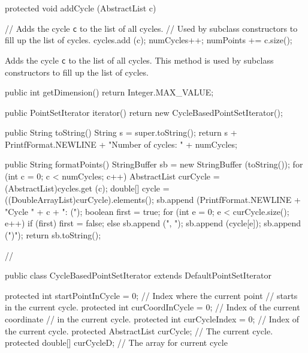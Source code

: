 \begin{code}

   protected void addCycle (AbstractList c) \begin{hide} {
      // Adds the cycle \texttt{c} to the list of all cycles.
      // Used by subclass constructors to fill up the list of cycles.
      cycles.add (c);
      numCycles++;
      numPoints += c.size();
   }\end{hide}
\end{code}
\begin{tabb}
   Adds the cycle \texttt{c} to the list of all cycles.
   This method is used by subclass constructors to fill up the list of cycles.
\end{tabb}
\begin{code}\begin{hide}

   public int getDimension() {
     return Integer.MAX_VALUE;
   }

   public PointSetIterator iterator(){
      return new  CycleBasedPointSetIterator();
   }

   public String toString() {
      String s = super.toString();
      return s + PrintfFormat.NEWLINE + "Number of cycles: " + numCycles;
   }

   public String formatPoints() {
      StringBuffer sb = new StringBuffer (toString());
      for (int c = 0; c < numCycles; c++) {
         AbstractList curCycle = (AbstractList)cycles.get (c);
         double[] cycle = ((DoubleArrayList)curCycle).elements();
         sb.append (PrintfFormat.NEWLINE + "Cycle " + c + ": (");
         boolean first = true;
         for (int e = 0; e < curCycle.size(); e++) {
            if (first)
               first = false;
            else
               sb.append (", ");
            sb.append (cycle[e]);
         }
         sb.append (")");
      }
      return sb.toString();
   }

   // %

   public class CycleBasedPointSetIterator extends DefaultPointSetIterator {

      protected int startPointInCycle = 0;   // Index where the current point
                                             // starts in the current cycle.
      protected int curCoordInCycle = 0;     // Index of the current coordinate
                                             // in the current cycle.
      protected int curCycleIndex = 0;       // Index of the current cycle.
      protected AbstractList curCycle;       // The current cycle.
      protected double[] curCycleD;          // The array for current cycle


}
\end{hide}
\end{code}
